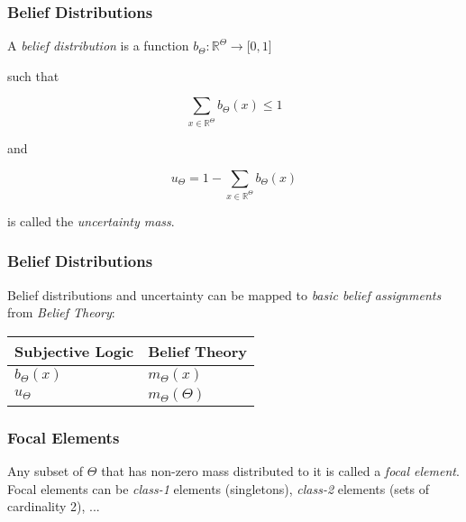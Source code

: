 \documentclass{beamer}
\begin{document}

\begin{frame}
\frametitle{Belief Distributions}

A \emph{belief distribution} is a function $b_\Theta: \mathbb{R}^\Theta \rightarrow \lbrack 0, 1 \rbrack$

such that

$$
\sum_{x \in \mathbb{R}^\Theta} b_\Theta \left( x \right) \leq 1
$$

and

$$
u_\Theta = 1 - \sum_{x \in \mathbb{R}^\Theta} b_\Theta \left( x \right)
$$

is called the \emph{uncertainty mass}.

\end{frame}


\begin{frame}
\frametitle{Belief Distributions}

Belief distributions and uncertainty can be mapped to \emph{basic belief assignments} from
\emph{Belief Theory}:


\begin{table}
\centering

\begin{tabular}{|l|l|}
  \hline
  Subjective Logic & Belief Theory \\
  \hline
  $b_\Theta\left( x \right)$ & $m_\Theta\left( x \right)$ \\
  $u_\Theta$                 & $m_\Theta \left(\Theta\right)$ \\
  \hline
\end{tabular}

\end{table}

\end{frame}


\begin{frame}
\frametitle{Focal Elements}

Any subset of $\Theta$ that has non-zero mass distributed to it is called a
\emph{focal element}. Focal elements can be \emph{class-1} elements (singletons),
\emph{class-2} elements (sets of cardinality 2), ...

\end{frame}
\end{document}
